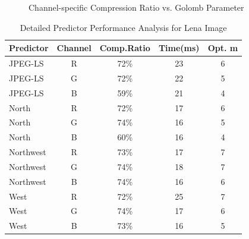 \documentclass[a4paper,14pt]{article}
\begin{document}
\begin{figure}[!htb]
\begin{minipage}{0.45\textwidth}
        \caption{Channel-specific Compression Ratio vs. Golomb Parameter}
        \label{fig:compression_ratio}
    \end{minipage}
\end{figure}

\begin{table}[!htb]
\centering
\small
\begin{tabular}{|l|c|c|c|c|}
\hline
\textbf{Predictor} & \textbf{Channel} & \textbf{Comp.Ratio} & \textbf{Time(ms)} & \textbf{Opt. m} \\
\hline
JPEG-LS & R & 72\% & 23 & 6 \\
JPEG-LS & G & 72\% & 22 & 5 \\
JPEG-LS & B & 59\% & 21 & 4 \\
\hline
North & R & 72\% & 17 & 6 \\
North & G & 74\% & 16 & 5 \\
North & B & 60\% & 16 & 4 \\
\hline
Northwest & R & 73\% & 17 & 7 \\
Northwest & G & 74\% & 18 & 7 \\
Northwest & B & 74\% & 16 & 6 \\
\hline
West & R & 72\% & 25 & 7 \\
West & G & 74\% & 17 & 6 \\
West & B & 73\% & 16 & 5 \\
\hline
\end{tabular}
\caption{Detailed Predictor Performance Analysis for Lena Image}
\label{tab:detailed_predictor_comparison}
\end{table}
\end{document}
